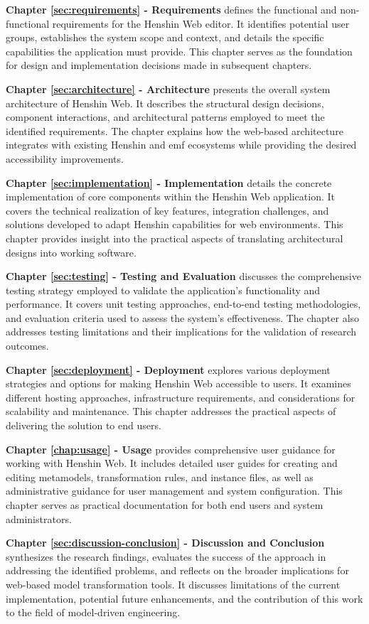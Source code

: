 \textbf{Chapter \ref{sec:requirements} - Requirements} defines the functional and non-functional requirements for the Henshin Web editor. It identifies potential user groups, establishes the system scope and context, and details the specific capabilities the application must provide. This chapter serves as the foundation for design and implementation decisions made in subsequent chapters.

\textbf{Chapter \ref{sec:architecture} - Architecture} presents the overall system architecture of Henshin Web. It describes the structural design decisions, component interactions, and architectural patterns employed to meet the identified requirements. The chapter explains how the web-based architecture integrates with existing Henshin and \ac{emf} ecosystems while providing the desired accessibility improvements.

\textbf{Chapter \ref{sec:implementation} - Implementation} details the concrete implementation of core components within the Henshin Web application. It covers the technical realization of key features, integration challenges, and solutions developed to adapt Henshin capabilities for web environments. This chapter provides insight into the practical aspects of translating architectural designs into working software.

\textbf{Chapter \ref{sec:testing} - Testing and Evaluation} discusses the comprehensive testing strategy employed to validate the application's functionality and performance. It covers unit testing approaches, end-to-end testing methodologies, and evaluation criteria used to assess the system's effectiveness. The chapter also addresses testing limitations and their implications for the validation of research outcomes.

\textbf{Chapter \ref{sec:deployment} - Deployment} explores various deployment strategies and options for making Henshin Web accessible to users. It examines different hosting approaches, infrastructure requirements, and considerations for scalability and maintenance. This chapter addresses the practical aspects of delivering the solution to end users.

\textbf{Chapter \ref{chap:usage} - Usage} provides comprehensive user guidance for working with Henshin Web. It includes detailed user guides for creating and editing metamodels, transformation rules, and instance files, as well as administrative guidance for user management and system configuration. This chapter serves as practical documentation for both end users and system administrators.

\textbf{Chapter \ref{sec:discussion-conclusion} - Discussion and Conclusion} synthesizes the research findings, evaluates the success of the approach in addressing the identified problems, and reflects on the broader implications for web-based model transformation tools. It discusses limitations of the current implementation, potential future enhancements, and the contribution of this work to the field of model-driven engineering.